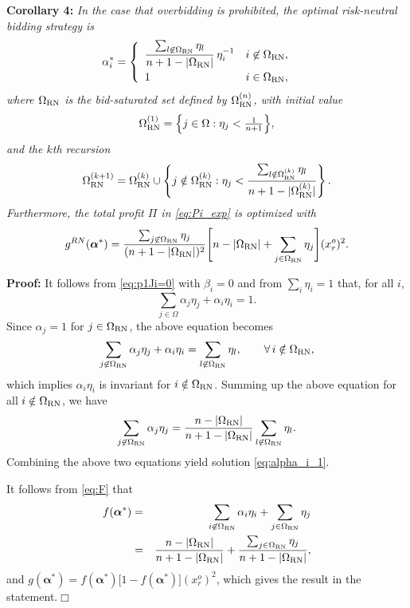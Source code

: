 \documentclass[conference]{IEEEtran}
\begin{document}
\noindent  \textbf{Corollary 4:} {\it In the case that overbidding is prohibited, the optimal risk-neutral bidding strategy is
\begin{equation}
 \hspace*{-0.2in}    \alpha_i^* = \left\{ \begin{array}{ll} \displaystyle \frac{\sum_{l\not\in\Omega_{\rm RN}} \eta_l}{n+1-|\Omega_{\rm RN}|}\,\eta_i^{-1}  & i\not \in\Omega_{\rm RN}, \\[8pt]
    1 & i\in\Omega_{\rm RN},
    \end{array} \right. \label{eq:alpha_i_1}
\end{equation}
where $\Omega_{\rm RN}$ is the bid-saturated set defined by $\Omega_{\rm RN}^{(n)}$, with initial value 
\begin{equation}
    \Omega_{\rm RN}^{(1)} = \Bigl\{j\in\Omega:\eta_j<\tfrac{1}{n+1}\Bigr\}, \label{eq:Omega_RN_1}
\end{equation}
and the $k$th recursion
\begin{equation}
    \Omega_{\rm RN}^{(k+1)} = \Omega_{\rm RN}^{(k)} 
    \cup\left\{j\notin\Omega_{\rm RN}^{(k)}:\eta_j<\frac{\sum_{l\notin\Omega_{\rm RN}^{(k)}}\eta_l}{n+1-|\Omega_{\rm RN}^{(k)}|}\right\}.
    \label{eq:Omega_RN_iter}
\end{equation}
Furthermore, the total profit $\Pi$ in \eqref{eq:Pi_exp} is optimized with}
\[
    g^{RN}(\boldsymbol{\alpha}^*) =  \frac{\sum_{j\not\in\Omega_{\rm RN}} \eta_j}{(n+1-|\Omega_{\rm RN}|)^2}
    \Biggl[ n-|\Omega_{\rm RN}| +\sum_{j\in\Omega_{\rm RN}} \eta_j \Biggr]
    (x_r^o)^2.
\]

\noindent \textbf{Proof:} It follows from \eqref{eq:p1Ji=0} with $\beta_i=0$ and from $\sum_i\eta_i=1$ that, for all $i$,
\begin{equation*}
  \sum_{j\in\Omega} \alpha_j\eta_j + \alpha_i \eta_i=1.
\end{equation*}
Since $\alpha_j=1$ for $j\in\Omega_{\rm RN}$, the above equation becomes
\[ \sum_{j\not\in\Omega_{\rm RN}} \alpha_j \eta_j + \alpha_i \eta_i
   = \sum_{l\not\in\Omega_{\rm RN}} \eta_l, \qquad \forall\, i\notin\Omega_{\rm RN},  \]
which implies $\alpha_i \eta_i$ is invariant for $i\notin\Omega_{\rm RN}$. Summing up the above equation for all $i\notin\Omega_{\rm RN}$, we have 
\[  \sum_{j\not\in\Omega_{\rm RN}} \alpha_j \eta_j = \frac{n - |\Omega_{\rm RN}|}{n+1 - |\Omega_{\rm RN}|} \sum_{l\not\in\Omega_{\rm RN}} \eta_l. \]
Combining the above two equations yield solution \eqref{eq:alpha_i_1}.

It follows from \eqref{eq:F} that
\begin{eqnarray*}
f(\boldsymbol{\alpha}^*) & = & \sum_{i\not\in\Omega_{\rm RN}} \alpha_i \eta_i + \sum_{j\in\Omega_{\rm RN}} \eta_j \\
& = & \frac{n-|\Omega_{\rm RN}|}{n+1-|\Omega_{\rm RN}|} +\frac{\sum_{j\in\Omega_{\rm RN}} \eta_j}{n+1-|\Omega_{\rm RN}|},
\end{eqnarray*}
and $g(\boldsymbol{\alpha}^*)=f(\boldsymbol{\alpha}^*)\bigl[1-f(\boldsymbol{\alpha}^*)\bigr](x_r^o)^2$, which gives the result in the statement.\hfill $\Box$
\end{document}
